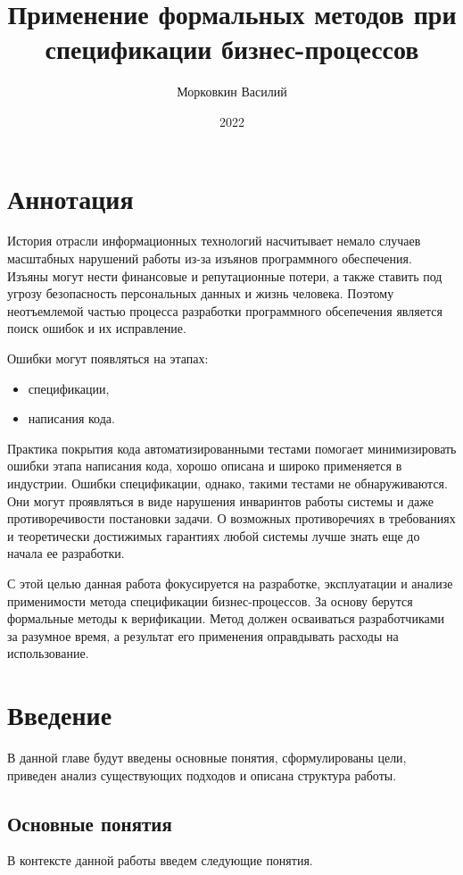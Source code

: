 \documentclass[14pt, openany]{report}
\title{Применение формальных методов при спецификации бизнес-процессов}
\author{Морковкин Василий}
\date{2022}
\begin{document}
\maketitle
\chapter*{Аннотация}
\par
История отрасли информационных технологий насчитывает немало случаев масштабных нарушений работы из-за изъянов программного обеспечения. Изъяны могут нести финансовые и репутационные потери, а также ставить под угрозу безопасность персональных данных и жизнь человека. Поэтому неотъемлемой частью процесса разработки программного обсепечения является поиск ошибок и их исправление.

Ошибки могут появляться на этапах:
\begin{itemize}
  \item спецификации,
  \item написания кода.
\end{itemize}

Практика покрытия кода автоматизированными тестами помогает минимизировать ошибки этапа написания кода, хорошо описана и широко применяется в индустрии. Ошибки спецификации, однако, такими тестами не обнаруживаются. Они могут проявляться в виде нарушения инваринтов работы системы и даже противоречивости постановки задачи. О возможных противоречиях в требованиях и теоретически достижимых гарантиях любой системы лучше знать еще до начала ее разработки. 

С этой целью данная работа фокусируется на разработке, эксплуатации и анализе применимости метода спецификации бизнес-процессов. За основу берутся формальные методы к верификации. Метод должен осваиваться разработчиками за разумное время, а результат его применения оправдывать расходы на использование.


\setcounter{page}{1}
\tableofcontents
\clearpage



\chapter{Введение}
В данной главе будут введены основные понятия, сформулированы цели, приведен анализ существующих подходов и описана структура работы.

\section{Основные понятия}
В контексте данной работы введем следующие понятия.
\end{document}
